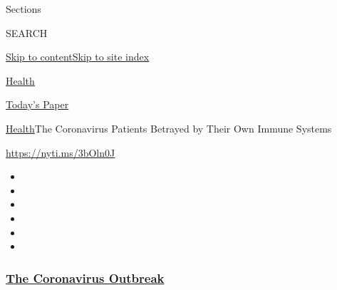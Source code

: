 Sections

SEARCH

\protect\hyperlink{site-content}{Skip to
content}\protect\hyperlink{site-index}{Skip to site index}

\href{https://www.nytimes3xbfgragh.onion/section/health}{Health}

\href{https://myaccount.nytimes3xbfgragh.onion/auth/login?response_type=cookie\&client_id=vi}{}

\href{https://www.nytimes3xbfgragh.onion/section/todayspaper}{Today's
Paper}

\href{/section/health}{Health}\textbar{}The Coronavirus Patients
Betrayed by Their Own Immune Systems

\url{https://nyti.ms/3bOln0J}

\begin{itemize}
\item
\item
\item
\item
\item
\item
\end{itemize}

\hypertarget{the-coronavirus-outbreak}{%
\subsubsection{\texorpdfstring{\href{https://www.nytimes3xbfgragh.onion/news-event/coronavirus?name=styln-coronavirus-national\&region=TOP_BANNER\&block=storyline_menu_recirc\&action=click\&pgtype=Article\&impression_id=7bc8d6a0-f2ba-11ea-bb9c-a332a2ba7fb3\&variant=undefined}{The
Coronavirus
Outbreak}}{The Coronavirus Outbreak}}\label{the-coronavirus-outbreak}}

